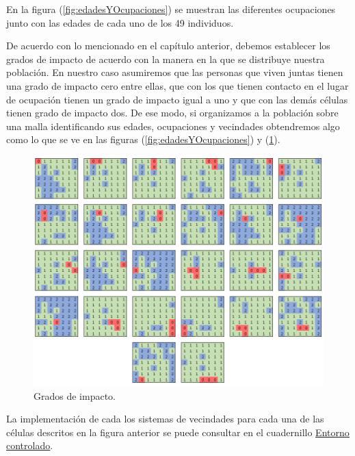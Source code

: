 En la figura (\ref{fig:edadesYOcupaciones}) se muestran las diferentes ocupaciones junto con las edades de cada uno de los 49 individuos.

De acuerdo con lo mencionado en el capítulo anterior, debemos establecer los grados de impacto de acuerdo con la manera en la que se distribuye nuestra población. En nuestro caso asumiremos que las personas que viven juntas tienen una grado de impacto cero entre ellas, que con los que tienen contacto en el lugar de ocupación tienen un grado de impacto igual a uno y que con las demás células tienen grado de impacto dos. De ese modo, si organizamos a la población sobre una malla identificando sus edades, ocupaciones y vecindades obtendremos algo como lo que se ve en las figuras (\ref{fig:edadesYOcupaciones}) y (\ref{fig:GradosdeImpactoEX4}).

\begin{figure}[h]
  \centering
    \includegraphics[width=1\textwidth]{Imagenes/vecindadesCap4.PNG}
    \caption{Grados de impacto.}
    \label{fig:GradosdeImpactoEX4}
\end{figure}

La implementación de cada los sistemas de vecindades para cada una de las células descritos en la figura anterior se puede consultar en el cuadernillo \href{https://github.com/Grupo-de-simulacion-con-automatas/CAsimulations-Modelacion-de-dinamicas-topologicas-en-la-propagacion-de-una-enfermedad-usando-CA/blob/master/Codigo/4.\%20Evoluci\%C3\%B3n\%20de\%20la\%20enfermedad\%20en\%20un\%20entorno\%20controlado.ipynb}{\underline{Entorno controlado}}.

